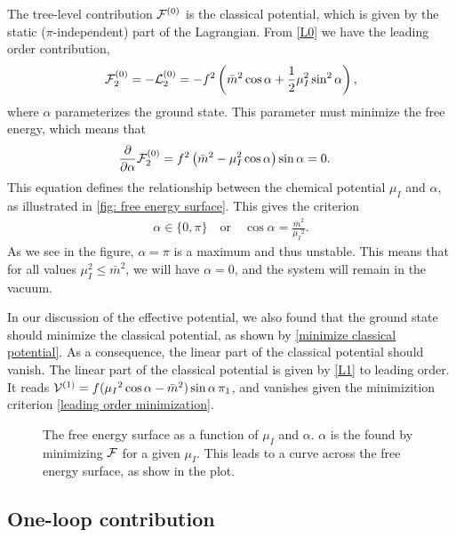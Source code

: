 The tree-level contribution $\mathcal{F}^{(0)}$ is the classical potential, which is given by the static ($\pi$-independent) part of the Lagrangian.
From \autoref{L0} we have the leading order contribution,
%
\begin{equation}
    \label{leading order contribution free energy}
    \mathcal{F}_2^{(0)}
    = - \mathcal{L}_2^{(0)} 
    = 
    -f^2   
    \left(
        \bar m^2 \cos{\alpha}
        + \frac{1}{2} \mu_I^2 \sin^2{\alpha}
    \right),
\end{equation}
%
where $\alpha$ parameterizes the ground state.
This parameter must minimize the free energy, which means that
%
\begin{align}
    &\pdv{}{\alpha} \mathcal{F}_2^{(0)} 
    = f^2\left(\bar m^2 - \mu_I^2\cos{\alpha}\right)\sin{\alpha}
    = 0.
\end{align}
%
This equation defines the relationship between the chemical potential $\mu_I$ and $\alpha$, as illustrated in \autoref{fig: free energy surface}.
This gives the criterion
%
\begin{align}
    \label{leading order minimization}
    \alpha \in \{0, \pi\} \quad
    \mathrm{or} \quad
    \cos{\alpha} = \frac{\bar m^2}{\mu_I{}^2}.
\end{align}
%
As we see in the figure, $\alpha = \pi$ is a maximum and thus unstable.
This means that for all values $\mu_I^2 \leq \bar m^2$, we will have $\alpha = 0$, and the system will remain in the vacuum.

In our discussion of the effective potential, we also found that the ground state should minimize the classical potential, as shown by \autoref{minimize classical potential}.
As a consequence, the linear part of the classical potential should vanish.
The linear part of the classical potential is given by \autoref{L1} to leading order. It reads $\mathcal{V}^{(1)} = f(\mu_I{}^2\cos{\alpha} - \bar m^2)\sin{\alpha} \, \pi_1 $, and vanishes given the minimizition criterion \autoref{leading order minimization}.
\begin{figure}[ht]
    \centering
    \caption{
        The free energy surface as a function of $\mu_I$ and $\alpha$. $\alpha$ is the found by minimizing $\mathcal{F}$ for a given $\mu_I$. This leads to a curve across the free energy surface, as show in the plot.
        }
    \label{fig: free energy surface}
\end{figure}



\subsection{One-loop contribution}

